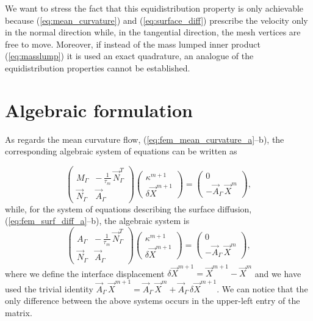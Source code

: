 We want to stress the fact that this equidistribution property is only
achievable because (\ref{eq:mean_curvature}) and (\ref{eq:surface_diff})
prescribe the velocity only in the normal direction while, in the tangential
direction, the mesh vertices are free to move. Moreover, if instead of the mass
lumped inner product (\ref{eq:masslump}) it is used an exact quadrature, an
analogue of the equidistribution properties cannot be established.

\section{Algebraic formulation}\label{sec:geometric_pdes_algebraic}
As regards the mean curvature flow, (\ref{eq:fem_mean_curvature_a}--b), the
corresponding algebraic system of equations can be written as

\begin{equation}\label{eq:algebraic_mean_curvature}
\begin{pmatrix}
M_\Gamma & -\,\frac{1}{\tau_m} \, \vec N_\Gamma^T \\
\vec N_\Gamma & \vec A_\Gamma
\end{pmatrix}
\begin{pmatrix}
\kappa^{m + 1} \\
\delta \vec X^{m + 1}
\end{pmatrix}
=
\begin{pmatrix}
0 \\
- \vec A_\Gamma \, \vec X^{m}
\end{pmatrix} ,
\end{equation}
while, for the system of equations describing the surface diffusion,
(\ref{eq:fem_surf_diff_a}--b), the algebraic system is
\begin{equation}\label{eq:algebraic_surf_diff}
\begin{pmatrix}
A_\Gamma & - \,\frac{1}{\tau_m}\, \vec N_\Gamma^T \\
\vec N_\Gamma & \vec A_\Gamma
\end{pmatrix}
\begin{pmatrix}
\kappa^{m + 1} \\
\delta \vec X^{m + 1}
\end{pmatrix}
=
\begin{pmatrix}
0 \\
- \vec A_\Gamma \, \vec X^m
\end{pmatrix},
\end{equation}
where we define the interface displacement $\delta \vec{X}^{m + 1}=\vec{X}^{m +
1} - \vec{X}^{m}$ and we have used the trivial identity $\vec A_\Gamma\,\vec
X^{m+1} = \vec A_\Gamma\,\vec X^m + \vec A_\Gamma\,\delta \vec X^{m+1}$. We can
notice that the only difference between the above systems occurs in the
upper-left entry of the matrix.

